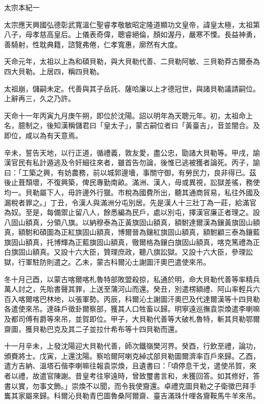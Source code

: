 
\begin{pinyinscope}
太宗本紀一

太宗應天興國弘德彰武寬溫仁聖睿孝敬敏昭定隆道顯功文皇帝，諱皇太極，太祖第八子，母孝慈高皇后。上儀表奇偉，聰睿絕倫，顏如渥丹，嚴寒不慄。長益神勇，善騎射，性耽典籍，諮覽弗倦，仁孝寬惠，廓然有大度。

天命元年，太祖以上為和碩貝勒，與大貝勒代善、二貝勒阿敏、三貝勒莽古爾泰為四大貝勒。上居四，稱四貝勒。

太祖崩，儲嗣未定。代善與其子岳託、薩哈廉以上才德冠世，與諸貝勒議請嗣位。上辭再三，久之乃許。

天命十一年丙寅九月庚午朔，即位於沈陽。詔以明年為天聰元年。初，太祖命上名，臆制之，後知漢稱儲君曰「皇太子」，蒙古嗣位者曰「黃臺吉」，音並闇合。及即位，咸以為有天意焉。

辛未，誓告天地，以行正道，循禮義，敦友愛，盡公忠，勖諸大貝勒等。甲戌，諭漢官民有私計遁逃及令奸細往來者，雖首告勿論，後惟已逃被獲者論死。丙子，諭曰：「工築之興，有妨農務，前以城郭邊墻，事關守御，有勞民力，良非得已。茲後止葺頹壞，不復興築，俾民專勤南畝。滿洲、漢人，毋或異視，訟獄差徭，務使均一。貝勒屬下人，毋許邊外行獵。市稅為國費所出，聽其通商貿易，私往外國及漏稅者罪之。」丁丑，令漢人與滿洲分屯別居。先是漢人十三壯丁為一莊，給滿官為奴。至是，每備禦止留八人，餘悉編為民戶，處以別屯，擇漢官廉正者理之。設八固山額真，分領八旗。以納穆泰為正黃旗固山額真，額駙達爾漢為鑲黃旗固山額真，額駙和碩圖為正紅旗固山額真，博爾晉為鑲紅旗固山額真，額駙顧三泰為鑲藍旗固山額真，托博輝為正藍旗固山額真，徹爾格為鑲白旗固山額真，喀克篤禮為正白旗固山額真。又設十六大臣，贊理庶政，聽八旗訟獄。又設十六大臣，參理訟獄，行軍駐防則遣之。乙未，蒙古科爾沁土謝圖汗奧巴遣使來吊。

冬十月己酉，以蒙古喀爾喀札魯特部敗盟殺掠，私通於明，命大貝勒代善等率精兵萬人討之，先貽書聲其罪，上送至蒲河山而還。癸丑，別遣楞額禮、阿山率輕兵六百入喀爾喀巴林地，以張軍勢。丙辰，科爾沁土謝圖汗奧巴及代達爾漢等十四貝勒各遣使來吊。達硃戶徵卦爾察部，獲其人口牲畜以歸。明寧遠巡撫袁崇煥遣李喇嘛及都司傅有爵等來吊，並賀即位。甲子，大貝勒代善等大破札魯特，斬其貝勒鄂爾齋圖，獲貝勒巴克及其二子並拉什希布等十四貝勒而還。

十一月辛未，上發沈陽迎大貝勒代善，師次鐵嶺樊河界。癸酉，行飲至禮，論功，頒賚將士。戊寅，上還沈陽。察哈爾阿喇克綽忒部貝勒圖爾濟率百戶來歸。乙酉，遣方吉納、溫塔石偕李喇嘛往報袁崇煥，且遺書曰：「頃停息干戈，遣使吊賀，來者以禮，故遣官陳謝。昔皇考往寧遠時，曾致璽書言和，未獲回答。如其修好，答書以實，勿事文飾。」崇煥不以聞，而令我使齎還。卓禮克圖貝勒之子衛徵巴拜手巂其家屬來歸。科爾沁貝勒青巴圖魯桑阿爾齋、臺吉滿珠什哩各齎鞍馬牛羊來吊。


\end{pinyinscope}
